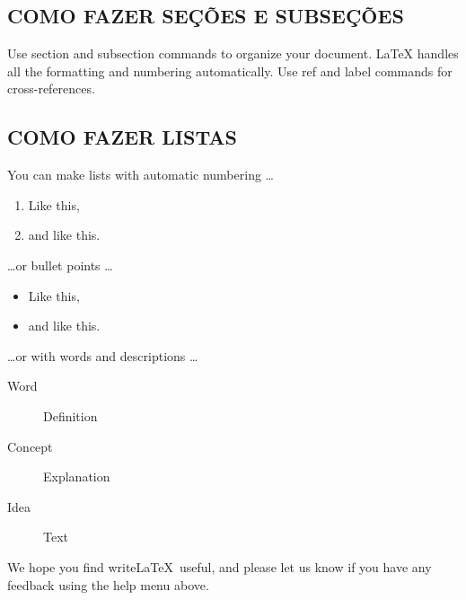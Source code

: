 \documentclass[12pt,article,a4paper,brazil]{abntex2}
\begin{document}
\subsection{COMO FAZER SEÇ\~OES E SUBSEÇ\~OES}

Use section and subsection commands to organize your document. \LaTeX{} handles all the formatting and numbering automatically. Use ref and label commands for cross-references.

\subsection{COMO FAZER LISTAS}

You can make lists with automatic numbering \dots

\begin{enumerate}
\item Like this,
\item and like this.
\end{enumerate}
\dots or bullet points \dots
\begin{itemize}
\item Like this,
\item and like this.
\end{itemize}
\dots or with words and descriptions \dots
\begin{description}
\item[Word] Definition
\item[Concept] Explanation
\item[Idea] Text
\end{description}

We hope you find write\LaTeX\ useful, and please let us know if you have any feedback using the help menu above.
\end{document}
